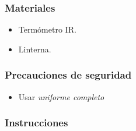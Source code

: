 \subsubsection{Materiales}
\begin{itemize}
	\item Termómetro IR.
	\item Linterna.
\end{itemize}

\subsubsection{Precauciones de seguridad}

\begin{itemize}
	\item Usar \emph{uniforme completo} %
\end{itemize}

\subsubsection{Instrucciones}

